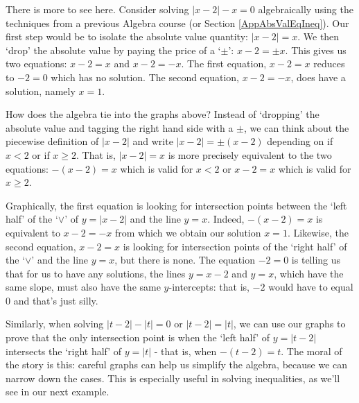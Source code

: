 \medskip

There is more to see here.  Consider solving $|x-2|-x=0$ algebraically using the techniques from a previous Algebra course (or Section \ref{AppAbsValEqIneq}).  Our first step would be to isolate the absolute value quantity:  $|x-2| = x$.  We  then `drop' the absolute value by paying the price of a `$\pm$':  $x-2 = \pm x$.  This gives us two equations:  $x - 2 = x$ and $x - 2 = -x$.  The first equation, $x-2 = x$ reduces to $-2 = 0$ which has no solution.  The second equation, $x-2 = -x$, does have a solution, namely $x = 1$.  

\medskip

How does the algebra tie into the graphs above?  Instead of `dropping' the absolute value and tagging the right hand side with a $\pm$, we can think about the piecewise definition of $|x-2|$ and write $|x-2| = \pm(x-2)$ depending on if $x < 2$ or if $x \geq 2$.  That is, $|x-2| = x$ is more precisely equivalent to the two equations: $-(x-2) = x$ which is valid for  $x < 2$ or $x-2 = x$   which is valid for $x \geq 2$.  

\medskip

Graphically, the first equation is looking for intersection points between the `left half' of the `$\vee$' of $y = |x-2|$ and the line $y =x$.  Indeed, $-(x-2)=x$ is equivalent to $x-2 = -x$ from which we obtain our solution $x = 1$. Likewise, the second equation, $x-2 = x$  is looking for intersection points of the 	`right half' of the `$\vee$' and the line $y = x$, but there is none.  The equation $-2=0$ is telling us that for us to have any solutions, the lines $y = x-2$ and $y = x$, which have the same slope, must also have the same $y$-intercepts:  that is, $-2$ would have to equal $0$ and that's just silly.  

\medskip

Similarly, when solving $|t-2| - |t| = 0$ or $|t-2| = |t|$, we can use our graphs to prove that the only intersection point is when the `left half' of $y = |t-2|$ intersects the `right half' of $y = |t|$ - that is, when $-(t-2) = t$.  The moral of the story is this:  careful graphs can help us simplify the algebra, because we can narrow down the cases.  This is especially useful in solving inequalities, as we'll see in our next example.

